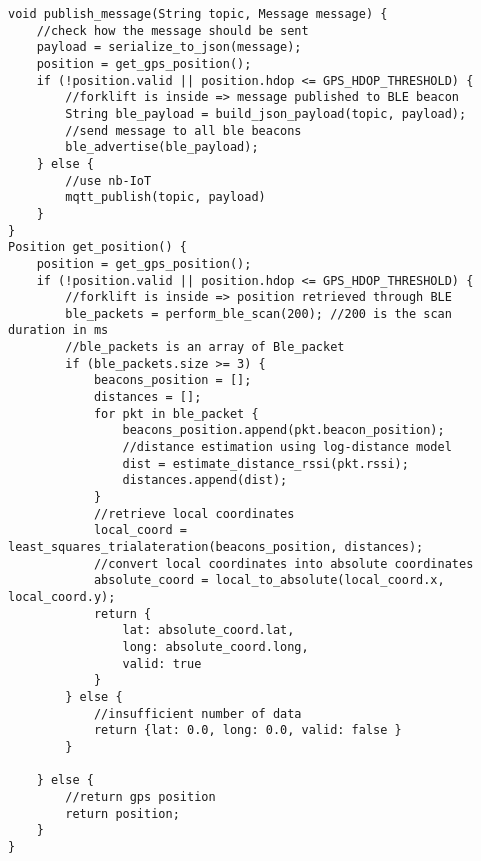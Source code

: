 \begin{verbatim}
void publish_message(String topic, Message message) {
    //check how the message should be sent
    payload = serialize_to_json(message);
    position = get_gps_position();
    if (!position.valid || position.hdop <= GPS_HDOP_THRESHOLD) {
        //forklift is inside => message published to BLE beacon
        String ble_payload = build_json_payload(topic, payload);
        //send message to all ble beacons
        ble_advertise(ble_payload);
    } else {
        //use nb-IoT
        mqtt_publish(topic, payload)
    }
}
Position get_position() {
    position = get_gps_position();
    if (!position.valid || position.hdop <= GPS_HDOP_THRESHOLD) {
        //forklift is inside => position retrieved through BLE
        ble_packets = perform_ble_scan(200); //200 is the scan duration in ms
        //ble_packets is an array of Ble_packet
        if (ble_packets.size >= 3) {
            beacons_position = [];
            distances = [];
            for pkt in ble_packet {
                beacons_position.append(pkt.beacon_position);
                //distance estimation using log-distance model
                dist = estimate_distance_rssi(pkt.rssi);
                distances.append(dist);
            }
            //retrieve local coordinates
            local_coord = least_squares_trialateration(beacons_position, distances);
            //convert local coordinates into absolute coordinates
            absolute_coord = local_to_absolute(local_coord.x, local_coord.y);
            return {
                lat: absolute_coord.lat,
                long: absolute_coord.long,
                valid: true
            }
        } else {
            //insufficient number of data
            return {lat: 0.0, long: 0.0, valid: false }
        }

    } else {
        //return gps position
        return position;
    }
}
\end{verbatim}
